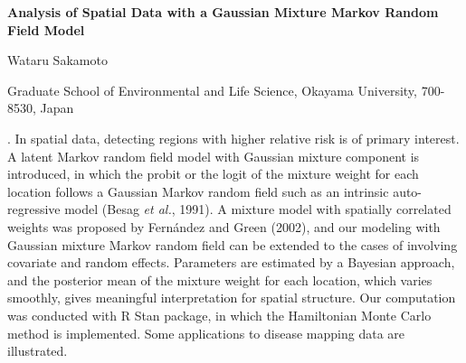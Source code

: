 \documentclass[12pt]{article}
\begin{document}
\begin{flushleft}


{\LARGE\bf Analysis of Spatial Data with a 
Gaussian Mixture Markov Random Field Model
}  


\vspace{1.0cm}

Wataru Sakamoto

\begin{description}

\item Graduate School of Environmental and Life Science, Okayama University, 700-8530, Japan


\end{description}

\end{flushleft}


\vspace{0.75cm}

. 
In spatial data, detecting regions with higher relative risk is of primary interest.  
A latent Markov random field model with Gaussian mixture component is introduced,
in which the probit or the logit of the mixture weight for each location follows 
a Gaussian Markov random field such as an intrinsic auto-regressive model (Besag \textit{et al.}, 1991). 
A mixture model with spatially correlated weights was proposed by Fern\'andez and Green (2002), 
and our modeling with Gaussian mixture Markov random field 
can be extended to the cases of involving covariate and random effects. 
Parameters are estimated by a Bayesian approach, 
and the posterior mean of the mixture weight for each location, which varies smoothly, 
gives meaningful interpretation for spatial structure.  
Our computation was conducted with R Stan package, 
in which the Hamiltonian Monte Carlo method is implemented.
Some applications to disease mapping data are illustrated.
\end{document}
